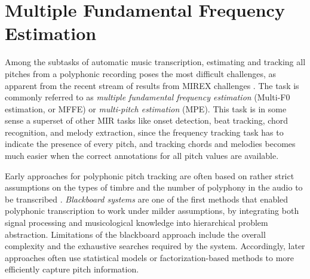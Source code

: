 \section{Multiple Fundamental Frequency Estimation}\label{sec:mffe}

Among the subtasks of automatic music transcription, estimating and tracking all pitches from a polyphonic recording poses the most difficult challenges, as apparent from the recent stream of results from MIREX challenges \cite{downie2014mirex}.
The task is commonly referred to as \emph{multiple fundamental frequency estimation} (Multi-F0 estimation, or MFFE) or \emph{multi-pitch estimation} (MPE).
This task is in some sense a superset of other MIR tasks like onset detection, beat tracking, chord recognition, and melody extraction,
since the frequency tracking task has to indicate the presence of every pitch, and tracking chords and melodies becomes much easier when the correct annotations for all pitch values are available.



Early approaches for polyphonic pitch tracking are often based on rather strict assumptions on the types of timbre and the number of polyphony in the audio to be transcribed \cite{moorer1977transcription,piszczalski1977transcription}. \emph{Blackboard systems} \cite{martin1996blackboard,dixon2000piano} are one of the first methods that enabled polyphonic transcription to work under milder assumptions, by integrating both signal processing and musicological knowledge into hierarchical problem abstraction. Limitations of the blackboard approach include the overall complexity and the exhaustive searches required by the system. Accordingly, later approaches often use statistical models or factorization-based methods to more efficiently capture pitch information.



